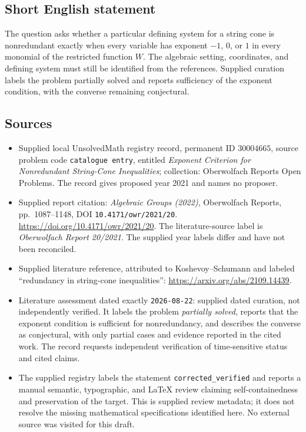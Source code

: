 \documentclass[11pt]{article}
\begin{document}
\subsection{Short English statement}
The question asks whether a particular defining system for a string cone is nonredundant exactly when every variable has exponent \(-1\), \(0\), or \(1\) in every monomial of the restricted function \(W\). The algebraic setting, coordinates, and defining system must still be identified from the references. Supplied curation labels the problem partially solved and reports sufficiency of the exponent condition, with the converse remaining conjectural.
\subsection{Sources}
\begin{itemize}
\item Supplied local UnsolvedMath registry record, permanent ID \(30004665\), source problem code \texttt{catalogue entry}, entitled \emph{Exponent Criterion for Nonredundant String-Cone Inequalities}; collection: Oberwolfach Reports Open Problems. The record gives proposed year 2021 and names no proposer.
\item Supplied report citation: \emph{Algebraic Groups (2022)}, Oberwolfach Reports, pp.~1087--1148, DOI \texttt{10.4171/owr/2021/20}. \url{https://doi.org/10.4171/owr/2021/20}. The literature-source label is \emph{Oberwolfach Report 20/2021}. The supplied year labels differ and have not been reconciled.
\item Supplied literature reference, attributed to Koshevoy--Schumann and labeled ``redundancy in string-cone inequalities'': \url{https://arxiv.org/abs/2109.14439}.
\item Literature assessment dated exactly \texttt{2026-08-22}: supplied dated curation, not independently verified. It labels the problem \emph{partially solved}, reports that the exponent condition is sufficient for nonredundancy, and describes the converse as conjectural, with only partial cases and evidence reported in the cited work. The record requests independent verification of time-sensitive status and cited claims.
\item The supplied registry labels the statement \texttt{corrected\_verified} and reports a manual semantic, typographic, and LaTeX review claiming self-containedness and preservation of the target. This is supplied review metadata; it does not resolve the missing mathematical specifications identified here. No external source was visited for this draft.
\end{itemize}
\end{document}
